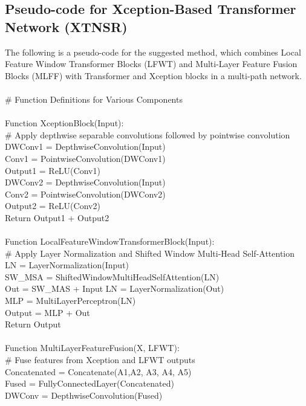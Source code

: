 \documentclass[twocolumn]{svjour3}          %
\begin{document}
\subsection{Pseudo-code for Xception-Based Transformer Network (XTNSR)}
The following is a pseudo-code for the suggested method, which combines Local Feature Window Transformer Blocks (LFWT) and Multi-Layer Feature Fusion Blocks (MLFF) with Transformer and Xception blocks in a multi-path network.\\
\\
\# Function Definitions for Various Components\\
\\
Function XceptionBlock(Input):\\
    \# Apply depthwise separable convolutions followed by pointwise convolution\\
    DWConv1 = DepthwiseConvolution(Input)\\
    Conv1 = PointwiseConvolution(DWConv1)\\
    Output1 = ReLU(Conv1)\\
    DWConv2 = DepthwiseConvolution(Input)\\
    Conv2 = PointwiseConvolution(DWConv2)\\
    Output2 = ReLU(Conv2)\\
    Return Output1 + Output2\\
\\
Function LocalFeatureWindowTransformerBlock(Input):\\
    \# Apply Layer Normalization and Shifted Window Multi-Head Self-Attention\\
    LN = LayerNormalization(Input)\\
    SW\_MSA = ShiftedWindowMultiHeadSelfAttention(LN)\\
    Out = SW\_MAS + Input
    LN = LayerNormalization(Out)\\
    MLP = MultiLayerPerceptron(LN)\\
    Output = MLP + Out\\
    Return Output\\
\\
Function MultiLayerFeatureFusion(X, LFWT):\\
    \# Fuse features from Xception and LFWT outputs\\
    Concatenated = Concatenate(A1,A2, A3, A4, A5)\\
    Fused = FullyConnectedLayer(Concatenated)\\
    DWConv = DepthwiseConvolution(Fused)\\
\end{document}
